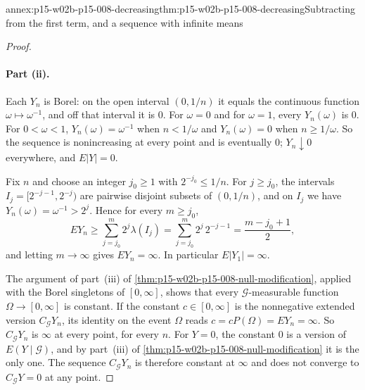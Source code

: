 \begin{annexitem}{annex:p15-w02b-p15-008-decreasing}{thm:p15-w02b-p15-008-decreasing}{Subtracting from the first term, and a sequence with infinite means}
\begin{proof}
\paragraph{Part (ii).}
Each \(Y_n\) is Borel: on the open interval \((0,1/n)\) it equals the
continuous function \(\omega\mapsto\omega^{-1}\), and off that interval it
is \(0\). For \(\omega=0\) and for \(\omega=1\), every \(Y_n(\omega)\) is
\(0\). For \(0<\omega<1\), \(Y_n(\omega)=\omega^{-1}\) when \(n<1/\omega\)
and \(Y_n(\omega)=0\) when \(n\geq1/\omega\). So the sequence is
nonincreasing at every point and is eventually \(0\); \(Y_n\downarrow0\)
everywhere, and \(E|Y|=0\).

Fix \(n\) and choose an integer \(j_0\geq1\) with \(2^{-j_0}\leq1/n\).
For \(j\geq j_0\), the intervals \(I_j=[2^{-j-1},2^{-j})\) are pairwise
disjoint subsets of \((0,1/n)\), and on \(I_j\) we have
\(Y_n(\omega)=\omega^{-1}>2^{j}\). Hence for every \(m\geq j_0\),
\[
 EY_n\geq\sum_{j=j_0}^{m}2^{j}\lambda(I_j)
       =\sum_{j=j_0}^{m}2^{j}\,2^{-j-1}=\frac{m-j_0+1}{2},
\]
and letting \(m\to\infty\) gives \(EY_n=\infty\). In particular
\(E|Y_1|=\infty\).

The argument of part~(iii) of
\cref{thm:p15-w02b-p15-008-null-modification}, applied with the Borel
singletons of \([0,\infty]\), shows that every \(\mathcal G\)-measurable
function \(\Omega\to[0,\infty]\) is constant. If the constant
\(c\in[0,\infty]\) is the nonnegative extended version
\(C_{\mathcal G}Y_n\), its identity on the event \(\Omega\) reads
\(c=cP(\Omega)=EY_n=\infty\). So \(C_{\mathcal G}Y_n\) is \(\infty\) at
every point, for every \(n\). For \(Y=0\), the constant \(0\) is a version
of \(E(Y\mid\mathcal G)\), and by part~(iii) of
\cref{thm:p15-w02b-p15-008-null-modification} it is the only one. The
sequence \(C_{\mathcal G}Y_n\) is therefore constant at \(\infty\) and does
not converge to \(C_{\mathcal G}Y=0\) at any point.
\end{proof}
\end{annexitem}
